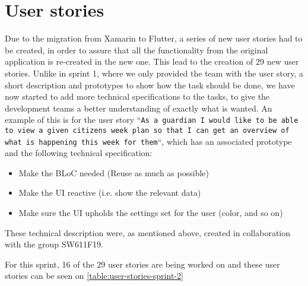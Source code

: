 \section{User stories}
Due to the migration from Xamarin to Flutter, a series of new user stories had to be created, in order to assure that all the functionality from the original application is re-created in the new one.
This lead to the creation of 29 new user stories.
Unlike in sprint 1, where we only provided the team with the user story, a short description and prototypes to show how the task should be done, we have now started to add more technical specifications to the tasks, to give the development teams a better understanding of exactly what is wanted.
An example of this is for the user story ``\texttt{As a guardian I would like to be able to view a given citizens week plan so that I can get an overview of what is happening this week for them}``, which has an associated prototype and the following technical specification:

\begin{itemize}
    \item Make the BLoC needed (Reuse as much as possible)
    \item Make the UI reactive (i.e. show the relevant data)
    \item Make sure the UI upholds the settings set for the user (color, and so on)
\end{itemize}
These technical description were, as mentioned above, created in collaboration with the group SW611F19.


\noindent For this sprint, 16 of the 29 user stories are being worked on and these user stories can be seen on \autoref{table:user-stories-sprint-2}


